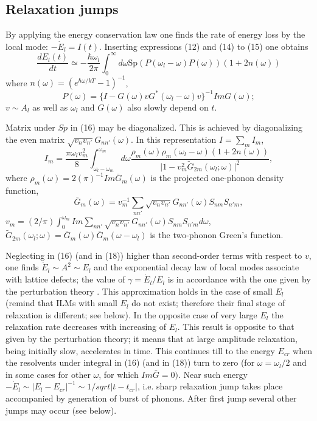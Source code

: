 \subsection{Relaxation jumps}
By applying the energy conservation law one finds the rate of energy loss by 
the local mode: $-\dot{E}_l=I(t)$. Inserting expressions (12) and (14) to (15) 
one obtains \cite{hizhrev}
\begin{equation}
\frac{dE_l(t)}{dt} \simeq -\frac{\hbar \omega_l}{2\pi} \int_0^{\infty}
d\omega \mbox{Sp} (P(\omega_l -\omega )P(\omega))(1+2n(\omega ))
\end{equation}
where $n(\omega)=(e^{\hbar\omega/kT}-1)^{-1}$,
\begin{equation}
P(\omega ) =  \lbrace I-G(\omega)vG^*(\omega_l-\omega )v\rbrace ^{-1}
ImG(\omega);
\end{equation}
$v \sim A_l$ as well as $\omega_l$ and $G(\omega)$ also slowly depend on $t$.

Matrix under $Sp$ in (16) may be diagonalized. This is achieved by 
diagonalizing the even matrix  $\sqrt{v_n v_{n'}} G_{nn'}(\omega)$.
In this representation  $I=\sum_m I_m$,
\begin{equation}
I_m = \frac{\pi \omega_l v_m^2}{8}\int_{\omega_l-\omega_m}^{\omega_m} d\omega
\frac{\rho_m(\omega)\rho_m(\omega_l - \omega)(1+2n(\omega))}
{\vert 1- v_m^2 \tilde{G}_{2m}(\omega_l;\omega)\vert^2},
\end{equation}
where $\rho_m (\omega) = 2(\pi)^{-1} Im \bar{G}_m(\omega)$ is the projected
one-phonon density function,
\begin{equation}
\bar{G}_m (\omega) =
 v_m^{-1}\sum_{nn'}\sqrt{v_n v_{n'}} G_{nn'}(\omega) S_{nm}S_{n'm},
\end{equation}
$v_m= (2/\pi)\int_0^{\omega_m}
Im\sum_{nn'}\sqrt{v_n v_{n'}} G_{nn'}(\omega) S_{nm}S_{n'm} d\omega$,
$\tilde{G}_{2m}(\omega_l;\omega)= \bar{G}_m(\omega)\bar{G}_m(\omega-\omega_l)$
is the two-phonon Green's function.

Neglecting in (16) (and in (18)) higher than second-order terms with respect to
$v$, one finds $\dot{E}_l \sim A^2 \sim E_l$ and the exponential decay law
of local modes associate with lattice defects; the value of 
$\gamma = \dot{E}_l/E_l$ is in accordance with the one given by the 
perturbation theory \cite{klemens}. This approximation holds in the case of 
small $E_l$ (remind that ILMs with small $E_l$ do not exist; therefore their 
final stage of relaxation is different; see below). In the opposite case of 
very large $E_l$ the relaxation rate decreases with increasing of $E_l$. This 
result is opposite to that given by the perturbation theory; it means that at 
large amplitude relaxation, being initially slow, accelerates in time. This 
continues  till to the energy $E_{cr}$ when the resolvents under integral in 
(16) (and in (18)) turn to zero (for $\omega = \omega_l/2$ and in some cases 
for other $\omega$, for which $Im \bar{G} = 0)$. Near such energy 
$-\dot{E}_l \sim |E_l-E_{cr}|^{-1} \sim 1/sqrt{|t-t_{cr}|}$, i.e. sharp 
relaxation jump takes place accompanied by generation of burst of phonons.
After first jump several other jumps  may occur (see below).
